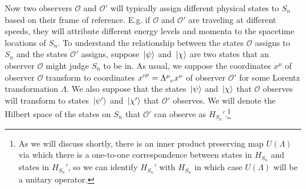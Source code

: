 Now two observers $\mathcal{O}$ and $\mathcal{O}'$ will typically assign different physical states to $S_n$ based on their frame of reference. E.g. if $\mathcal{O}$ and $\mathcal{O}'$ are traveling at different speeds, they will attribute different energy levels and momenta to the spacetime locations of $S_n$. To understand the relationship between the states $\mathcal{O}$ assigns to $S_n$ and the states $\mathcal{O}'$ assigns, suppose $\ket*{\psi}$ and  $\ket*{\chi}$ are two states that an observer $\mathcal{O}$ might judge $S_n$ to be in. As usual, we suppose the coordinates $x^\mu$ of observer $\mathcal{O}$ transform to coordinates ${x'}^\mu=\Lambda\indices{^\mu_\nu}x^\nu$ of observer $\mathcal{O}'$ for some Lorentz transformation $\Lambda.$ We also suppose that the states $\ket*{\psi}$ and $\ket*{\chi}$ that $\mathcal{O}$ observes will transform to states $\ket*{\psi'}$  and $\ket*{\chi'}$ that $\mathcal{O}'$ observes. %
%
 We will denote the Hilbert space of the states on $S_n$ that $\mathcal{O}'$ can observe as $H_{S_n}'$.\label{Hprimespace}\footnote{As we will discuss shortly, there is an inner product preserving map $U(\Lambda)$ via which there is a one-to-one correspondence between states in $H_{S_n}$ and states in $H_{S_n}'$, so we can identify $H_{S_n}'$ with $H_{S_n}$ in which case $U(\Lambda)$ will be a unitary operator.}%
%

